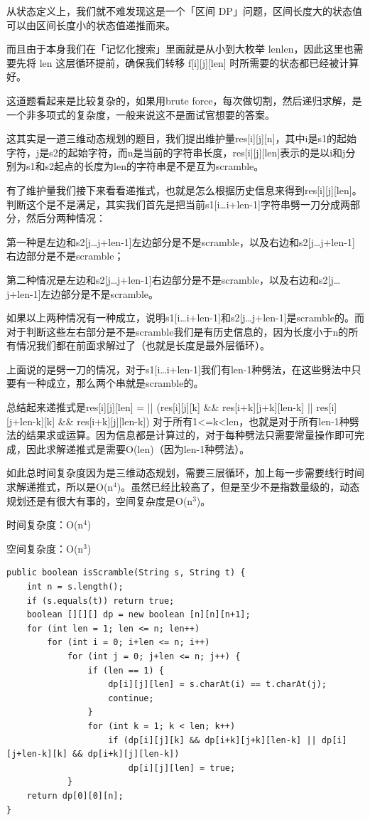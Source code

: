 \documentclass[9pt, b5paaper]{book}
\begin{document}
从状态定义上，我们就不难发现这是一个「区间 DP」问题，区间长度大的状态值可以由区间长度小的状态值递推而来。

而且由于本身我们在「记忆化搜索」里面就是从小到大枚举 lenlen，因此这里也需要先将 len 这层循环提前，确保我们转移 f[i][j][len] 时所需要的状态都已经被计算好。

这道题看起来是比较复杂的，如果用brute force，每次做切割，然后递归求解，是一个非多项式的复杂度，一般来说这不是面试官想要的答案。

这其实是一道三维动态规划的题目，我们提出维护量res[i][j][n]，其中i是s1的起始字符，j是s2的起始字符，而n是当前的字符串长度，res[i][j][len]表示的是以i和j分别为s1和s2起点的长度为len的字符串是不是互为scramble。

有了维护量我们接下来看看递推式，也就是怎么根据历史信息来得到res[i][j][len]。判断这个是不是满足，其实我们首先是把当前s1[i\ldots{}i+len-1]字符串劈一刀分成两部分，然后分两种情况：

第一种是左边和s2[j\ldots{}j+len-1]左边部分是不是scramble，以及右边和s2[j\ldots{}j+len-1]右边部分是不是scramble；

第二种情况是左边和s2[j\ldots{}j+len-1]右边部分是不是scramble，以及右边和s2[j\ldots{}j+len-1]左边部分是不是scramble。

如果以上两种情况有一种成立，说明s1[i\ldots{}i+len-1]和s2[j\ldots{}j+len-1]是scramble的。而对于判断这些左右部分是不是scramble我们是有历史信息的，因为长度小于n的所有情况我们都在前面求解过了（也就是长度是最外层循环）。

上面说的是劈一刀的情况，对于s1[i\ldots{}i+len-1]我们有len-1种劈法，在这些劈法中只要有一种成立，那么两个串就是scramble的。

总结起来递推式是res[i][j][len] = || (res[i][j][k] \&\& res[i+k][j+k][len-k] || res[i][j+len-k][k] \&\& res[i+k][j][len-k]) 对于所有1<=k<len，也就是对于所有len-1种劈法的结果求或运算。因为信息都是计算过的，对于每种劈法只需要常量操作即可完成，因此求解递推式是需要O(len)（因为len-1种劈法）。

如此总时间复杂度因为是三维动态规划，需要三层循环，加上每一步需要线行时间求解递推式，所以是O(n$^{\text{4}}$)。虽然已经比较高了，但是至少不是指数量级的，动态规划还是有很大有事的，空间复杂度是O(n$^{\text{3}}$)。

时间复杂度：O(n$^{\text{4}}$)

空间复杂度：O(n$^{\text{3}}$)

\begin{verbatim}
public boolean isScramble(String s, String t) {
    int n = s.length();
    if (s.equals(t)) return true;
    boolean [][][] dp = new boolean [n][n][n+1];
    for (int len = 1; len <= n; len++) 
        for (int i = 0; i+len <= n; i++) 
            for (int j = 0; j+len <= n; j++) {
                if (len == 1) {
                    dp[i][j][len] = s.charAt(i) == t.charAt(j);
                    continue;
                }
                for (int k = 1; k < len; k++) 
                    if (dp[i][j][k] && dp[i+k][j+k][len-k] || dp[i][j+len-k][k] && dp[i+k][j][len-k])
                        dp[i][j][len] = true;
            }
    return dp[0][0][n];
}
\end{verbatim}
\end{document}
